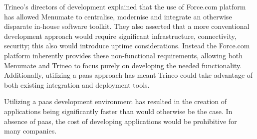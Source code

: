 Trineo's \cite{trineoCaseStudy} directors of development explained that the use of Force.com platform has
allowed Menumate to centralise, modernise and integrate an otherwise disparate in-house software toolkit. 
They also asserted that a more conventional development approach would require significant infrastructure,
connectivity, security; this also would introduce uptime considerations. Instead the Force.com
platform inherently provides these non-functional requirements, allowing both Menumate and Trineo to
focus purely on developing the needed functionality. Additionally, utilizing a \ac{paas} approach
has meant Trineo could take advantage of both existing integration and deployment tools.

Utilizing a \ac{paas} development environment has resulted in the creation of applications being
significantly faster than would otherwise be the case. In absence of \ac{paas}, the cost of developing
applications would be prohibitive for many companies.